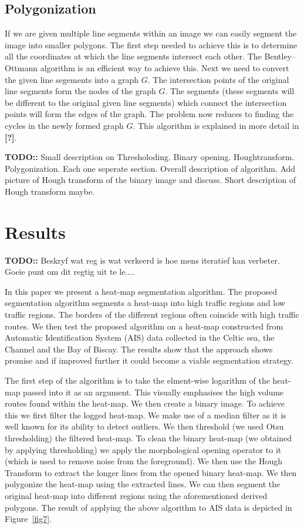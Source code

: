 \documentclass{article}
\begin{document}
\subsection{Polygonization}
If we are given multiple line segments within an image we can easily segment the image into smaller polygons. The first step needed to achieve this is to determine 
all the coordinates at which the line segments intersect each other. The Bentley–Ottmann algorithm is an efficient way to achieve this. Next we need to convert the given line 
segements into a graph $G$. The intersection points of the original line segments form the nodes of the graph $G$. The segments (these segments will be different to the original given line segments)
which connect the intersection points will form the edges of the graph. The problem now reduces to finding the cycles in the newly formed graph $G$. This algorithm is explained in more detail in \textbf{[?]}.


 \textbf{TODO::} Small description on Thresholoding. Binary opening. Houghtransform. Polygonization. Each one seperate section. Overall description of algorithm. Add picture of Hough 
 transform of the binary image and discuss. Short description of Hough transform maybe. 
 
 
 
 \section{Results}
 \textbf{TODO::} Beskryf wat reg is wat verkeerd is hoe mens iteratief kan verbeter. Goeie punt om dit regtig uit te le....
 
 
In this paper we present a heat-map segmentation algorithm. The proposed segmentation algorithm
segments a heat-map into high traffic regions and low traffic regions. The borders of the different regions often coincide with high traffic routes. We then test the proposed 
algorithm on a heat-map constructed from Automatic Identification System (AIS) data collected in the Celtic sea, the Channel and the Bay of Biscay. The results show that the approach shows promise and if improved further 
it could become a viable segmentation strategy.
 
The first step of the algorithm is to take the elment-wise logarithm of the heat-map passed into it as an argument. This visually emphasises the high volume routes found within the heat-map. We then 
create a binary image. To achieve this we first filter the logged heat-map. We make use of a median filter as it is well known for its ability to detect outliers. We then threshold (we used Otsu thresholding) the  
filtered heat-map. To clean the binary heat-map (we obtained by applying thresholding) we apply the morphological opening operator to it (which is used to remove noise from the foreground).
We then use the Hough Transform to extract the longer lines from the opened binary heat-map. We then polygonize the heat-map using the extracted lines. We can then 
segment the original heat-map into different regions using the aforementioned derived polygons. The result of applying the above algorithm to AIS data is depicted in Figure~\ref{fig7}.
\end{document}
